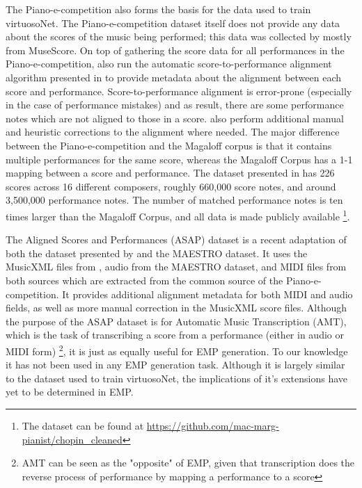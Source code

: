 The Piano-e-competition also forms the basis for the data used to train virtuosoNet. The Piano-e-competition dataset itself does not provide any data about the scores of the music being performed; this data was collected by \citet{jeong2019virtuosonet} mostly from MuseScore. On top of gathering the score data for all performances in the Piano-e-competition, \citet{jeong2019virtuosonet} also run the automatic score-to-performance alignment algorithm presented in \cite{nakamura2017performance} to provide metadata about the alignment between each score and performance. Score-to-performance alignment is error-prone (especially in the case of performance mistakes) and as result, there are some performance notes which are not aligned to those in a score. \citet{jeong2019virtuosonet} also perform additional manual and heuristic corrections to the alignment where needed. The major difference between the Piano-e-competition and the Magaloff corpus is that it contains multiple performances for the same score, whereas the Magaloff Corpus has a 1-1 mapping between a score and performance. The dataset presented in \cite{jeong2019virtuosonet} has 226 scores across 16 different composers, roughly 660,000 score notes, and around 3,500,000 performance notes. The number of matched performance notes is ten times larger than the Magaloff Corpus, and all data is made publicly available \footnote{The dataset can be found at \url{https://github.com/mac-marg-pianist/chopin_cleaned}}. 

The Aligned Scores and Performances (ASAP) dataset \cite{foscarin2020asap} is a recent adaptation of both the dataset presented by \citet{jeong2019virtuosonet} and the MAESTRO dataset. It uses the MusicXML files from \citet{jeong2019virtuosonet}, audio from the MAESTRO dataset, and MIDI files from both sources which are extracted from the common source of the Piano-e-competition. It provides additional alignment metadata for both MIDI and audio fields, as well as more manual correction in the MusicXML score files. Although the purpose of the ASAP dataset is for Automatic Music Transcription (AMT), which is the task of transcribing a score from a performance (either in audio or MIDI form) \footnote{AMT can be seen as the "opposite" of EMP, given that transcription does the reverse process of performance by mapping a performance to a score}, it is just as equally useful for EMP generation. To our knowledge it has not been used in any EMP generation task. Although it is largely similar to the dataset used to train virtuosoNet, the implications of it's extensions have yet to be determined in EMP. 



